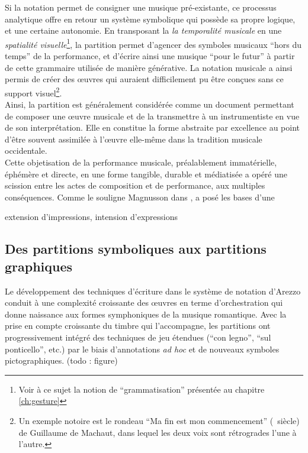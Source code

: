 \noindent Si la notation permet de consigner une musique pré-existante, ce processus analytique offre en retour un système symbolique qui possède sa propre logique, et une certaine autonomie. En transposant la \textit{la temporalité musicale} en une \textit{spatialité visuelle}\footnote{Voir à ce sujet la notion de ``grammatisation'' présentée au chapitre \ref{ch:gesture}}, la partition permet d'agencer des symboles musicaux ``hors du temps'' de la performance, et d'écrire ainsi une musique ``pour le futur'' à partir de cette grammaire utilisée de manière générative. La notation musicale a ainsi permis de créer des œuvres qui auraient difficilement pu être conçues sans ce support visuel\footnote{Un exemple notoire est le rondeau ``Ma fin est mon commencement'' (~siècle) de Guillaume de Machaut, dans lequel les deux voix sont rétrogrades l'une à l'autre.}.\\
\indent Ainsi, la partition est généralement considérée comme un document permettant de composer une œuvre musicale et de la transmettre à un instrumentiste en vue de son interprétation. Elle en constitue la forme abstraite par excellence au point d'être souvent assimilée à l'œuvre elle-même dans la tradition musicale occidentale.\\
\indent Cette objetisation de la performance musicale, préalablement immatérielle, éphémère et directe, en une forme tangible, durable et médiatisée a opéré une scission entre les actes de composition et de performance, aux multiples conséquences. Comme le souligne Magnusson dans \cite{magnusson_algorithms_2011},  a posé les bases d'une 

extension d'impressions, intension d'expressions
\subsection{Des partitions symboliques aux partitions graphiques}

\noindent Le développement des techniques d'écriture dans le système de notation d'Arezzo conduit à une complexité croissante des œuvres en terme d'orchestration qui donne naissance aux formes symphoniques de la musique romantique. Avec la prise en compte croissante du timbre qui l'accompagne, les partitions ont progressivement intégré des techniques de jeu étendues (``con legno'', ``sul ponticello'', etc.) par le biais d'annotations \textit{ad hoc} et de nouveaux symboles pictographiques. (todo : figure)

